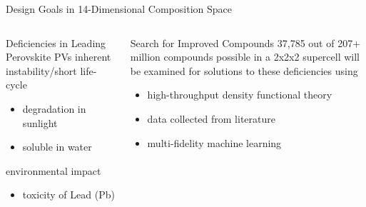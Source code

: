 \documentclass[10pt, aspectratio=169, presentation]{beamer}
\begin{document}
\begin{frame}[label={sec:orgc0e6297}]{Design Goals in \alert{14-Dimensional} Composition Space}
\begin{columns}
\begin{column}{0.5\columnwidth}
\begin{block}{Deficiencies in Leading Perovskite PVs}
inherent instability/short life-cycle
\begin{itemize}
\item degradation in sunlight
\item soluble in water
\end{itemize}
environmental impact
\begin{itemize}
\item toxicity of Lead (Pb)
\end{itemize}
\end{block}

 
\begin{center}

\end{center}
\end{column}

\begin{column}{0.5\columnwidth}
 
\begin{center}

\end{center}

\begin{block}{Search for Improved Compounds}
\alert{37,785} out of \alert{207+ million} compounds possible in a 2x2x2 supercell
will be examined for solutions to these deficiencies using
\begin{itemize}
\item high-throughput density functional theory
\item data collected from literature
\item multi-fidelity machine learning
\end{itemize}
\end{block}
\end{column}
\end{columns}
\end{frame}
\end{document}
